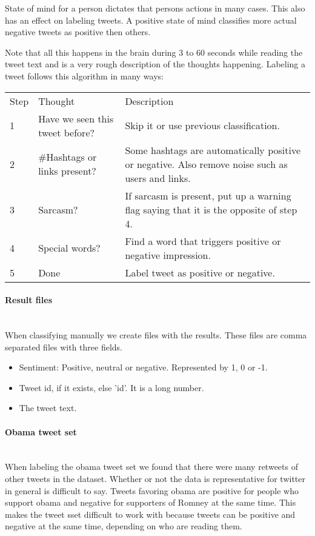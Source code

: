 State of mind for a person dictates that persons actions in many cases. This
also has an effect on labeling tweets. A positive state of mind classifies more
actual negative tweets as positive then others.

Note that all this happens in the brain during 3 to 60 seconds while reading
the tweet text and is a very rough description of the thoughts happening.
Labeling a tweet follows this algorithm in many ways:

\begin{tabular}{ l p{5cm} p{7cm} }
Step & Thought & Description \\
1 & Have we seen this tweet before? & Skip it or use previous classification. \\
2 & \#Hashtags or links present? & Some hashtags are automatically positive or
negative. Also remove noise such as users and links.\\
3 & Sarcasm? & If sarcasm is present, put up a warning flag saying that it is
the opposite of step 4.\\
4 & Special words? & Find a word that triggers positive or negative
impression.\\
5 & Done & Label tweet as positive or negative.\\
\end{tabular}

\paragraph{Result files}
\hspace{0pt}\\
When classifying manually we create files with the results. These files
are comma separated files with three fields.
\begin{itemize}
    \item Sentiment: Positive, neutral or negative. Represented by 1, 0 or -1.
    \item Tweet id, if it exists, else 'id'. It is a long number.
    \item The tweet text.
\end{itemize}

\paragraph{Obama tweet set}
\hspace{0pt}\\
When labeling the obama tweet set we found that there were many retweets of
other tweets in the dataset. Whether or not the data is representative for
twitter in general is difficult to say. Tweets favoring obama are positive for
people who support obama and negative for supporters of Romney at the same
time. This makes the tweet sset difficult to work with because tweets can be
positive and negative at the same time, depending on who are reading them.  

